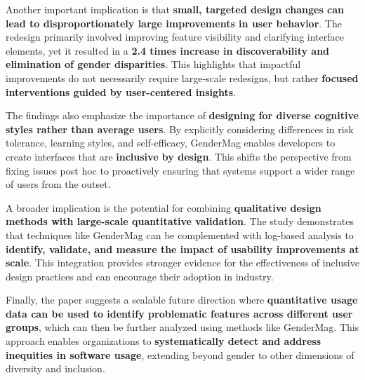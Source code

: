 Another important implication is that \textbf{small, targeted design changes can lead to disproportionately large improvements in user behavior}. The redesign primarily involved improving feature visibility and clarifying interface elements, yet it resulted in a \textbf{2.4 times increase in discoverability and elimination of gender disparities}. This highlights that impactful improvements do not necessarily require large-scale redesigns, but rather \textbf{focused interventions guided by user-centered insights}.

The findings also emphasize the importance of \textbf{designing for diverse cognitive styles rather than average users}. By explicitly considering differences in risk tolerance, learning styles, and self-efficacy, GenderMag enables developers to create interfaces that are \textbf{inclusive by design}. This shifts the perspective from fixing issues post hoc to proactively ensuring that systems support a wider range of users from the outset.

A broader implication is the potential for combining \textbf{qualitative design methods with large-scale quantitative validation}. The study demonstrates that techniques like GenderMag can be complemented with log-based analysis to \textbf{identify, validate, and measure the impact of usability improvements at scale}. This integration provides stronger evidence for the effectiveness of inclusive design practices and can encourage their adoption in industry.

Finally, the paper suggests a scalable future direction where \textbf{quantitative usage data can be used to identify problematic features across different user groups}, which can then be further analyzed using methods like GenderMag. This approach enables organizations to \textbf{systematically detect and address inequities in software usage}, extending beyond gender to other dimensions of diversity and inclusion.